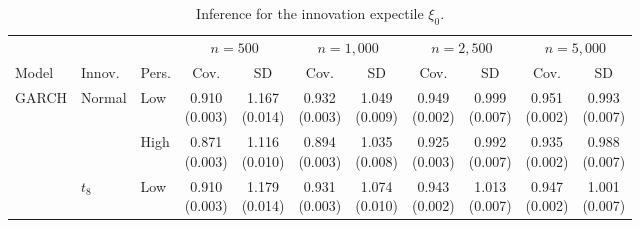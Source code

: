 \begin{table}[!t]
\centering
\caption{Inference for the innovation expectile $\xi_0$.}
\label{tab:mc-xi}
\scriptsize
\setlength{\tabcolsep}{3.2pt}
\begin{tabular}{lllcccccccc}
\toprule
&&&\multicolumn{2}{c}{$n=500$}&\multicolumn{2}{c}{$n=1{,}000$}&\multicolumn{2}{c}{$n=2{,}500$}&\multicolumn{2}{c}{$n=5{,}000$}\\
\cmidrule(lr){4-5}\cmidrule(lr){6-7}\cmidrule(lr){8-9}\cmidrule(lr){10-11}
Model&Innov.&Pers.&Cov.&SD&Cov.&SD&Cov.&SD&Cov.&SD\\
\midrule
GARCH & Normal & Low & \shortstack{0.910\\[-1pt]\scriptsize(0.003)} & \shortstack{1.167\\[-1pt]\scriptsize(0.014)} & \shortstack{0.932\\[-1pt]\scriptsize(0.003)} & \shortstack{1.049\\[-1pt]\scriptsize(0.009)} & \shortstack{0.949\\[-1pt]\scriptsize(0.002)} & \shortstack{0.999\\[-1pt]\scriptsize(0.007)} & \shortstack{0.951\\[-1pt]\scriptsize(0.002)} & \shortstack{0.993\\[-1pt]\scriptsize(0.007)}\\
 &  & High & \shortstack{0.871\\[-1pt]\scriptsize(0.003)} & \shortstack{1.116\\[-1pt]\scriptsize(0.010)} & \shortstack{0.894\\[-1pt]\scriptsize(0.003)} & \shortstack{1.035\\[-1pt]\scriptsize(0.008)} & \shortstack{0.925\\[-1pt]\scriptsize(0.003)} & \shortstack{0.992\\[-1pt]\scriptsize(0.007)} & \shortstack{0.935\\[-1pt]\scriptsize(0.002)} & \shortstack{0.988\\[-1pt]\scriptsize(0.007)}\\
\addlinespace[1pt]
 & $t_8$ & Low & \shortstack{0.910\\[-1pt]\scriptsize(0.003)} & \shortstack{1.179\\[-1pt]\scriptsize(0.014)} & \shortstack{0.931\\[-1pt]\scriptsize(0.003)} & \shortstack{1.074\\[-1pt]\scriptsize(0.010)} & \shortstack{0.943\\[-1pt]\scriptsize(0.002)} & \shortstack{1.013\\[-1pt]\scriptsize(0.007)} & \shortstack{0.947\\[-1pt]\scriptsize(0.002)} & \shortstack{1.001\\[-1pt]\scriptsize(0.007)}\\

\end{tabular}
\end{table}
